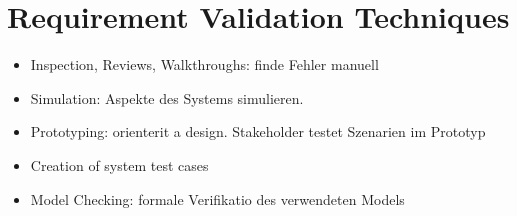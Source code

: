 \section{Requirement Validation Techniques}
\begin{itemize}
    \item Inspection, Reviews, Walkthroughs: finde Fehler manuell
    \item Simulation: Aspekte des Systems simulieren.
    \item Prototyping: orienterit a design. Stakeholder testet Szenarien im
    Prototyp
    \item Creation of system test cases
    \item Model Checking: formale Verifikatio des verwendeten Models
\end{itemize}
